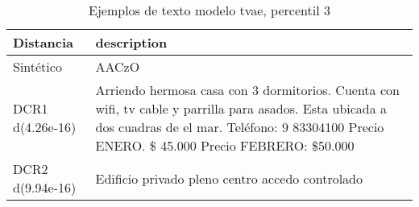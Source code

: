 \begin{table}[H]
\centering
\fontsize{10}{14}\selectfont
\caption{Ejemplos de texto modelo tvae, percentil 3}
\label{table-example-economicos-b-1-tvae-3p-text}
\begin{tabular}{|l|m{35em}|}
\hline
\rowcolor[gray]{0.8}
Distancia & description \\
\hline Sintético & AACzO \\
\hline DCR1 d(4.26e-16) & Arriendo hermosa casa con 3 dormitorios. Cuenta con wifi, tv cable y parrilla para asados. Esta ubicada a dos cuadras de el mar. Tel\'efono: 9 83304100
Precio ENERO. \$ 45.000
Precio FEBRERO: \$50.000
 \\
\hline DCR2 d(9.94e-16) & Edificio privado pleno centro accedo controlado \\
\hline
\end{tabular}
\end{table}
